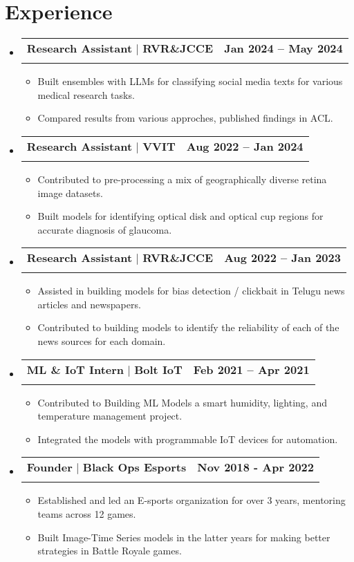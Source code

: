 \documentclass[letterpaper,11pt]{article}
\makeatletter
\newcommand{\resumeItem}[1]{\item\small{{#1 \vspace{-2pt}}}}
\newcommand{\resumeSubheading}[4]{ \vspace{-3pt}\item \begin{tabular*}{0.97\textwidth}[t]{l@{\extracolsep{\fill}}r} 
   #1 & #2 \\ \textit{\small#3} & \textit{\small #4} \\ \end{tabular*}\vspace{-8pt}}
\newcommand{\resumeSubHeadingListStart}{\begin{itemize}[leftmargin=0.08in, label={}]}
\newcommand{\resumeSubHeadingListEnd}{\end{itemize}}
\newcommand{\resumeItemListStart}{\begin{itemize}}
\newcommand{\resumeItemListEnd}{\end{itemize}\vspace{-8pt}}
\makeatother
\begin{document}
\section{\textbf{\textcolor{myColor1}{Experience}}}
  \resumeSubHeadingListStart
  \vspace{2pt}
    \resumeSubheading
      {\textbf{Research Assistant } $|$ \textbf{ RVR\&JCCE}}{\textbf{Jan 2024 – May 2024}}
      {}{}\vspace{-13pt}
      \resumeItemListStart
        \resumeItem{Built ensembles with LLMs for classifying social media texts for various medical research tasks.}
        \resumeItem{Compared results from various approches, published findings in ACL.}
      \resumeItemListEnd
    \resumeSubheading
      {\textbf{Research Assistant } $|$ \textbf{ VVIT}}{\textbf{Aug 2022 – Jan 2024}}
      {}{}\vspace{-13pt}
      \resumeItemListStart
        \resumeItem{Contributed to pre-processing a mix of geographically diverse retina image datasets.}
        \resumeItem{Built models for identifying optical disk and optical cup regions for accurate diagnosis of glaucoma.}
      \resumeItemListEnd
    \resumeSubheading
      {\textbf{Research Assistant } $|$ \textbf{ RVR\&JCCE}}{\textbf{Aug 2022 – Jan 2023}}
      {}{}\vspace{-13pt}
      \resumeItemListStart
        \resumeItem{Assisted in building models for bias detection / clickbait in Telugu news articles and newspapers.}
        \resumeItem{Contributed to building models to identify the reliability of each of the news sources for each domain.}
      \resumeItemListEnd
    \resumeSubheading
      {\textbf{ML \& IoT Intern } $|$ \textbf{ Bolt IoT}}{\textbf{Feb 2021 – Apr 2021}}
      {}{}\vspace{-13pt}
      \resumeItemListStart
        \resumeItem{Contributed to Building ML Models a smart humidity, lighting, and temperature management project.}
        \resumeItem{Integrated the models with programmable IoT devices for automation.}
      \resumeItemListEnd     
    \resumeSubheading
      {\textbf{Founder } $|$ \textbf{ Black Ops Esports}}{\textbf{Nov 2018 - Apr 2022}}
      {}{}\vspace{-13pt}
      \resumeItemListStart
        \resumeItem{Established and led an E-sports organization for over 3 years, mentoring teams across 12 games.}
        \resumeItem{Built Image-Time Series models in the latter years for making better strategies in Battle Royale games.}
      \resumeItemListEnd
    \resumeSubHeadingListEnd \vspace{-14pt}
\end{document}
